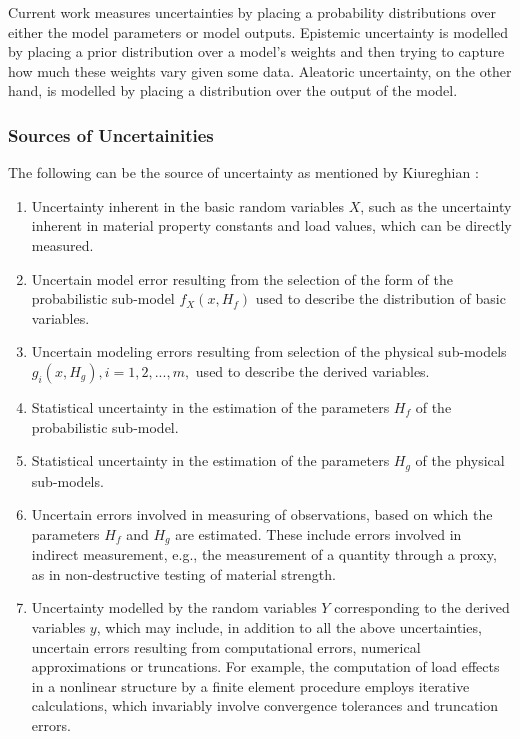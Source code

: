 Current work measures uncertainties by placing a probability distributions over either the model parameters or model outputs. Epistemic uncertainty is modelled by placing a prior distribution over a model's weights and then trying to capture how much these weights vary given some data. Aleatoric uncertainty, on the other hand, is modelled by placing a distribution over the output of the model.

\subsubsection{Sources of Uncertainities}

The following can be the source of uncertainty as mentioned by Kiureghian \cite{Kiureghian}:

\begin{enumerate}
    \item Uncertainty inherent in the basic random variables $X$, such as the uncertainty inherent in material property constants and load values, which can be directly measured.
    \item Uncertain model error resulting from the selection of the form of the probabilistic sub-model $f_{X}(x,H_{f})$ used to describe the distribution of basic variables.
    \item  Uncertain modeling errors resulting from selection of the physical sub-models $g_{i}(x,H_{g}), i = 1,2,...,m,$ used to describe the derived variables.
    \item  Statistical uncertainty in the estimation of the parameters $H_f$ of the probabilistic sub-model.
    \item  Statistical uncertainty in the estimation of the parameters $H_g$ of the physical sub-models.
    \item  Uncertain errors involved in measuring of observations, based on which the parameters $H_f$ and $H_g$  are estimated. These include errors involved in indirect measurement, e.g., the measurement of a quantity through a proxy, as in non-destructive testing of material strength.
    \item Uncertainty modelled by the random variables $Y$ corresponding to the derived variables $y$, which may include, in addition to all the above uncertainties, uncertain errors resulting from computational errors, numerical approximations or truncations. For example, the computation of load effects in a nonlinear structure by a finite element procedure employs iterative calculations, which invariably involve convergence tolerances and truncation errors.
\end{enumerate} 

